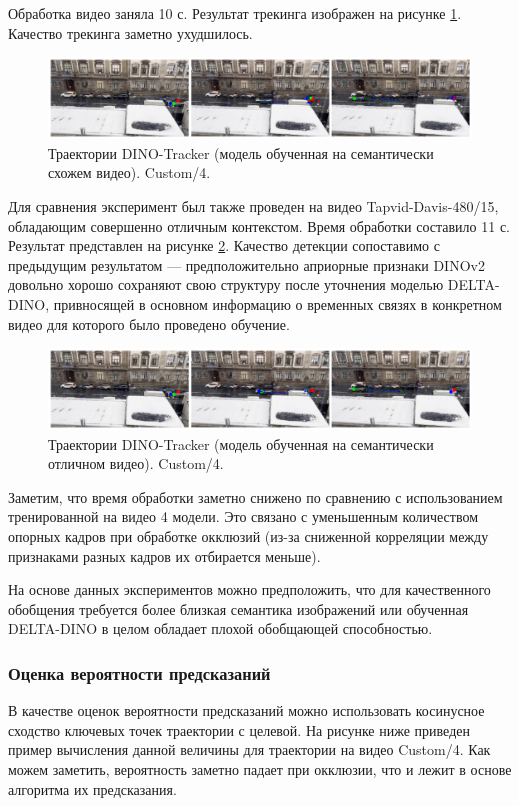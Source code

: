 \documentclass[a4paper, 14pt]{extarticle}
\theoremstyle{definition}
\theoremstyle{plain}
\theoremstyle{remark}
\begin{document}
Обработка видео заняла 10 с. Результат трекинга изображен на рисунке \ref{fig:custom-4-sem}. Качество трекинга заметно ухудшилось.
\begin{figure}
    [H]
    \centering
    \includegraphics[width=\textwidth]{figs/custom-4-sem.png}
    \caption{Траектории DINO-Tracker (модель обученная на семантически схожем видео). Custom/4.}
    \label{fig:custom-4-sem}
\end{figure}

Для сравнения эксперимент был также проведен на видео Tapvid-Davis-480/15, обладающим совершенно отличным контекстом. Время обработки составило 11 с. Результат представлен на рисунке \ref{fig:custom-4-bad-sem}. Качество детекции сопоставимо с предыдущим результатом --- предположительно априорные признаки DINOv2 довольно хорошо сохраняют свою структуру после уточнения моделью DELTA-DINO, привносящей в основном информацию о временных связях в конкретном видео для которого было проведено обучение.
\begin{figure}
    [H]
    \centering
    \includegraphics[width=\textwidth]{figs/custom-4-bad-sem.png}
    \caption{Траектории DINO-Tracker (модель обученная на семантически отличном видео). Custom/4.}
    \label{fig:custom-4-bad-sem}
\end{figure}

Заметим, что время обработки заметно снижено по сравнению с использованием тренированной на видео 4 модели. Это связано с уменьшенным количеством опорных кадров при обработке окклюзий (из-за сниженной корреляции между признаками разных кадров их отбирается меньше).

На основе данных экспериментов можно предположить, что для качественного обобщения требуется более близкая семантика изображений или обученная DELTA-DINO в целом обладает плохой обобщающей способностью.

\subsubsection{Оценка вероятности предсказаний}
В качестве оценок вероятности предсказаний можно использовать косинусное сходство ключевых точек траектории с целевой. На рисунке ниже приведен пример вычисления данной величины для траектории на видео Custom/4. Как можем заметить, вероятность заметно падает при окклюзии, что и лежит в основе алгоритма их предсказания.
\end{document}
